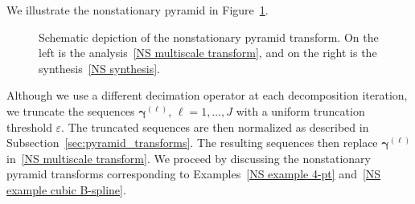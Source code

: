 \documentclass[11pt,a4paper]{article}
\theoremstyle{definition}
\begin{document}
We illustrate the nonstationary pyramid in Figure~\ref{fig:epyramid}.
\begin{figure}[htbp] 
    \begin{center}
\qquad\qquad
{}
\caption{Schematic depiction of the nonstationary pyramid transform. On the left is the analysis~\eqref{NS multiscale transform}, and on the right is the synthesis~\eqref{NS synthesis}.}
 \label{fig:epyramid}
\end{center}
\end{figure}

Although we use a different decimation operator at each decomposition iteration, we truncate the sequences $\boldsymbol{\gamma}^{(\ell)}$, $\ell=1,\dots, J$ with a uniform truncation threshold $\varepsilon$. The truncated sequences are then normalized as described in Subsection~\ref{sec:pyramid_transforms}. The resulting sequences then replace $\boldsymbol{\gamma}^{(\ell)}$ in~\eqref{NS multiscale transform}. We proceed by discussing the nonstationary pyramid transforms corresponding to Examples~\ref{NS example 4-pt} and~\ref{NS example cubic B-spline}.
\end{document}
